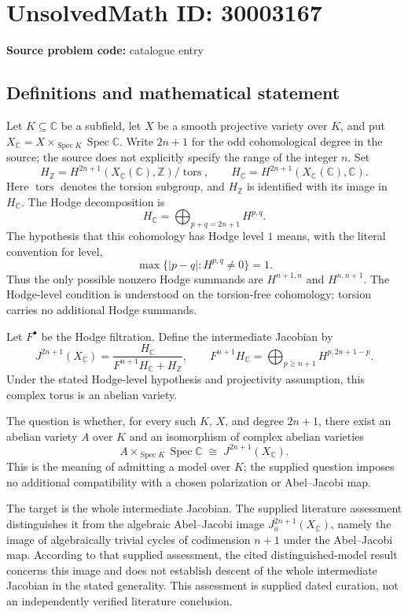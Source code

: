 \documentclass[11pt]{article}
\newcommand{\Z}{\mathbb{Z}}
\newcommand{\C}{\mathbb{C}}
\begin{document}
\section*{UnsolvedMath ID: 30003167}
\textbf{Source problem code:} catalogue entry
\subsection{Definitions and mathematical statement}
Let \(K\subseteq\C\) be a subfield, let \(X\) be a smooth projective variety over \(K\), and put \(X_{\C}=X\times_{\operatorname{Spec}K}\operatorname{Spec}\C\). Write \(2n+1\) for the odd cohomological degree in the source; the source does not explicitly specify the range of the integer \(n\). Set
\[
H_{\Z}=H^{2n+1}(X_{\C}(\C),\Z)/\operatorname{tors},\qquad
H_{\C}=H^{2n+1}(X_{\C}(\C),\C).
\]
Here \(\operatorname{tors}\) denotes the torsion subgroup, and \(H_{\Z}\) is identified with its image in \(H_{\C}\). The Hodge decomposition is
\[
H_{\C}=\bigoplus_{p+q=2n+1}H^{p,q}.
\]
The hypothesis that this cohomology has Hodge level \(1\) means, with the literal convention for level,
\[
\max\{\lvert p-q\rvert:H^{p,q}\ne0\}=1.
\]
Thus the only possible nonzero Hodge summands are \(H^{n+1,n}\) and \(H^{n,n+1}\). The Hodge-level condition is understood on the torsion-free cohomology; torsion carries no additional Hodge summands.

Let \(F^{\bullet}\) be the Hodge filtration. Define the intermediate Jacobian by
\[
J^{2n+1}(X_{\C})=
\frac{H_{\C}}{F^{n+1}H_{\C}+H_{\Z}},
\qquad
F^{n+1}H_{\C}=\bigoplus_{p\ge n+1}H^{p,2n+1-p}.
\]
Under the stated Hodge-level hypothesis and projectivity assumption, this complex torus is an abelian variety.

The question is whether, for every such \(K\), \(X\), and degree \(2n+1\), there exist an abelian variety \(A\) over \(K\) and an isomorphism of complex abelian varieties
\[
A\times_{\operatorname{Spec}K}\operatorname{Spec}\C
\;\cong\;J^{2n+1}(X_{\C}).
\]
This is the meaning of admitting a model over \(K\); the supplied question imposes no additional compatibility with a chosen polarization or Abel--Jacobi map.

The target is the whole intermediate Jacobian. The supplied literature assessment distinguishes it from the algebraic Abel--Jacobi image \(J_a^{2n+1}(X_{\C})\), namely the image of algebraically trivial cycles of codimension \(n+1\) under the Abel--Jacobi map. According to that supplied assessment, the cited distinguished-model result concerns this image and does not establish descent of the whole intermediate Jacobian in the stated generality. This assessment is supplied dated curation, not an independently verified literature conclusion.
\end{document}
